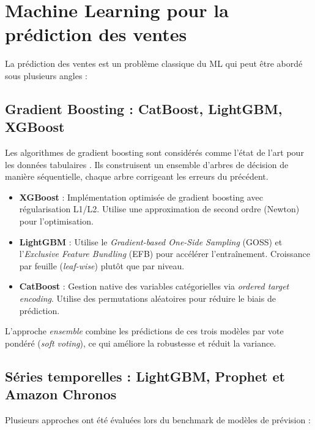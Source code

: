 \documentclass[12pt,a4paper]{report}
\begin{document}
\section{Machine Learning pour la pr\'{e}diction des ventes}

La pr\'{e}diction des ventes est un probl\`{e}me classique du ML qui peut \^{e}tre abord\'{e} sous plusieurs angles :

\subsection{Gradient Boosting : CatBoost, LightGBM, XGBoost}

Les algorithmes de gradient boosting sont consid\'{e}r\'{e}s comme l'\'{e}tat de l'art pour les donn\'{e}es tabulaires \cite{grinsztajn2022tree}. Ils construisent un ensemble d'arbres de d\'{e}cision de mani\`{e}re s\'{e}quentielle, chaque arbre corrigeant les erreurs du pr\'{e}c\'{e}dent.

\begin{itemize}
  \item \textbf{XGBoost} \cite{chen2016xgboost} : Impl\'{e}mentation optimis\'{e}e de gradient boosting avec r\'{e}gularisation L1/L2. Utilise une approximation de second ordre (Newton) pour l'optimisation.
  \item \textbf{LightGBM} \cite{ke2017lightgbm} : Utilise le \textit{Gradient-based One-Side Sampling} (GOSS) et l'\textit{Exclusive Feature Bundling} (EFB) pour acc\'{e}l\'{e}rer l'entra\^{i}nement. Croissance par feuille (\textit{leaf-wise}) plut\^{o}t que par niveau.
  \item \textbf{CatBoost} \cite{prokhorenkova2018catboost} : Gestion native des variables cat\'{e}gorielles via \textit{ordered target encoding}. Utilise des permutations al\'{e}atoires pour r\'{e}duire le biais de pr\'{e}diction.
\end{itemize}

L'approche \textit{ensemble} combine les pr\'{e}dictions de ces trois mod\`{e}les par vote pond\'{e}r\'{e} (\textit{soft voting}), ce qui am\'{e}liore la robustesse et r\'{e}duit la variance.

\subsection{S\'{e}ries temporelles : LightGBM, Prophet et Amazon Chronos}

Plusieurs approches ont \'{e}t\'{e} \'{e}valu\'{e}es lors du benchmark de mod\`{e}les de pr\'{e}vision :
\end{document}
